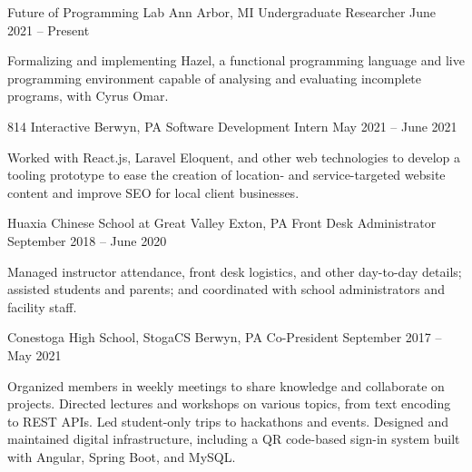 \documentclass[letterpaper,11pt]{article}
\begin{document}
  \begin{rsectionlist}
    \rsectionitem
      {Future of Programming Lab}
      {Ann Arbor, MI}
      {Undergraduate Researcher}
      {June 2021 -- Present}
      
      Formalizing and implementing Hazel, a functional programming language and live programming
      environment capable of analysing and evaluating incomplete programs, with Cyrus Omar.

      \begin{rpointlist}
      \end{rpointlist}

    \rsectionitem
      {814 Interactive}
      {Berwyn, PA}
      {Software Development Intern}
      {May 2021 -- June 2021}

      Worked with React.js, Laravel Eloquent, and other web technologies to develop a tooling
      prototype to ease the creation of location- and service-targeted website content and improve
      SEO for local client businesses.

    \rsectionitem
      {Huaxia Chinese School at Great Valley}
      {Exton, PA}
      {Front Desk Administrator}
      {September 2018 -- June 2020}

      Managed instructor attendance, front desk logistics, and other day-to-day details; assisted
      students and parents; and coordinated with school administrators and facility staff.

    \rsectionitem
      {Conestoga High School, StogaCS}
      {Berwyn, PA}
      {Co-President}
      {September 2017 -- May 2021}

      Organized members in weekly meetings to share knowledge and collaborate on projects. Directed
      lectures and workshops on various topics, from text encoding to REST APIs. Led student-only
      trips to hackathons and events. Designed and maintained digital infrastructure, including a QR
      code-based sign-in system built with Angular, Spring Boot, and MySQL.
  \end{rsectionlist}
\end{document}
